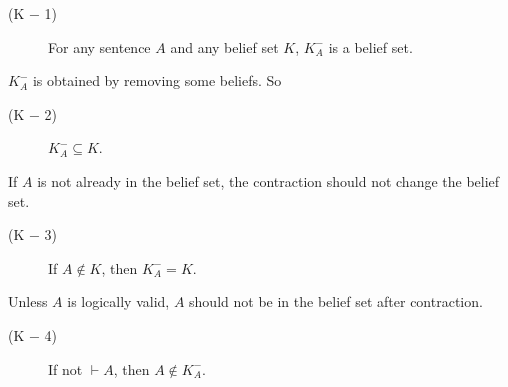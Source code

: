 \documentclass{sfuthesis}
\theoremstyle{plain}
\theoremstyle{definition}
\begin{document}
\begin{description}
\item[(K $-$ 1)] For any sentence $A$ and any belief set $K$, $K^{-}_{A}$ is a belief set.
\end{description}
$K^{-}_{A}$ is obtained by removing some beliefs. So
\begin{description}
\item[(K $-$ 2)] $K^{-}_{A} \subseteq K$. 
\end{description}
If $A$ is not already in the belief set, the contraction should not change the belief set.
\begin{description}
\item[(K $-$ 3)] If $A \notin K$, then $K^{-}_{A} = K$. 
\end{description}
Unless $A$ is logically valid, $A$ should not be in the belief set after contraction.
\begin{description}
\item[(K $-$ 4)] If not $\vdash A$, then $A \notin K^{-}_{A}$. 
\end{description}
\end{document}
